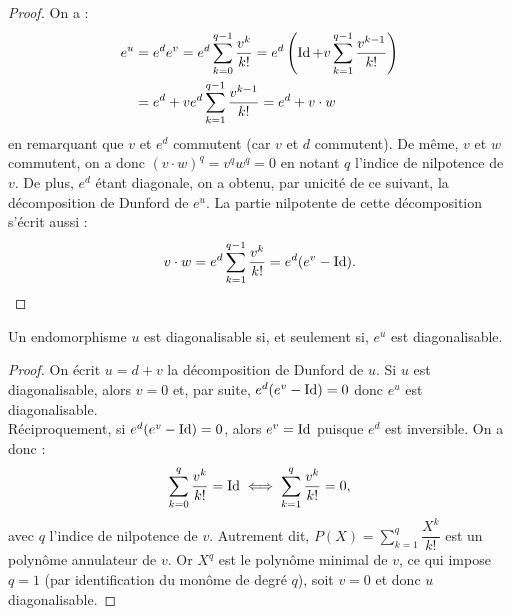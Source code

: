 \begin{proof}
On a :
\begin{align*}
e^u & = e^d e^v = e^d \sum_{k=0}^{q-1} \dfrac{v^k}{k!} = e^d \left ( \operatorname{Id} + v \sum_{k=1}^{q-1} \dfrac{v^{k-1}}{k!} \right ) \\
& = e^d + v e^d \sum_{k=1}^{q-1} \dfrac{v^{k-1}}{k!} = e^d + v \cdot w
\end{align*}
en remarquant que $v$ et $e^d$ commutent (car $v$ et $d$ commutent). De même, $v$ et $w$ commutent, on a donc 
$(v \cdot w)^q = v^q w^q = 0$ en notant $q$ l'indice de nilpotence de $v$. De plus, $e^d$ étant diagonale, on a obtenu, par 
unicité de ce suivant, la décomposition de Dunford de $e^u$. La partie nilpotente de cette décomposition s'écrit aussi :
\[ v \cdot w =  e^d \sum_{k=1}^{q-1} \dfrac{v^k}{k!} = e^d(e^v-\operatorname{Id}) . \]
\end{proof}

\begin{coro}
Un endomorphisme $u$ est diagonalisable si, et seulement si, $e^u$ est diagonalisable.
\end{coro}

\begin{proof}
On écrit $u = d+v$ la décomposition de Dunford de $u$. Si $u$ est diagonalisable, alors $v=0$ et, par suite, $e^d(e^v-\operatorname{Id}) = 0$ donc
$e^u$ est diagonalisable. \\
Réciproquement, si $e^d(e^v-\operatorname{Id}) = 0$, alors $e^v = \operatorname{Id}$ puisque $e^d$ est inversible. On a donc :
\[ \sum_{k=0}^q \dfrac{v^k}{k!} = \operatorname{Id} \iff \sum_{k=1}^q \dfrac{v^k}{k!} = 0 , \]
avec $q$ l'indice de nilpotence de $v$. Autrement dit, $P(X) = \sum_{k=1}^q \dfrac{X^k}{k!}$ est un polynôme annulateur de $v$.
Or $X^q$ est le polynôme minimal de $v$, ce qui impose $q=1$ (par identification du monôme de degré $q$), soit $v=0$ et donc
$u$ diagonalisable. 
\end{proof}




